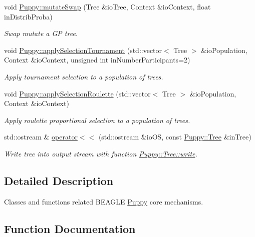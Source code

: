 \begin{DoxyCompactItemize}
void \hyperlink{group__Puppy_gab2879a2766d6a1dc22304f39d502656f}{Puppy\+::mutate\+Swap} (Tree \&io\+Tree, Context \&io\+Context, float in\+Distrib\+Proba)
\begin{DoxyCompactList}\small\item\em Swap mutate a G\+P tree. \end{DoxyCompactList}\item 
void \hyperlink{group__Puppy_gaf6abed44ba1d792876575211a238e317}{Puppy\+::apply\+Selection\+Tournament} (std\+::vector$<$ Tree $>$ \&io\+Population, Context \&io\+Context, unsigned int in\+Number\+Participants=2)
\begin{DoxyCompactList}\small\item\em Apply tournament selection to a population of trees. \end{DoxyCompactList}\item 
void \hyperlink{group__Puppy_gacdee177409bac54392b16bc8ba2f630b}{Puppy\+::apply\+Selection\+Roulette} (std\+::vector$<$ Tree $>$ \&io\+Population, Context \&io\+Context)
\begin{DoxyCompactList}\small\item\em Apply roulette proportional selection to a population of trees. \end{DoxyCompactList}\item 
std\+::ostream \& \hyperlink{group__Puppy_ga055f36ab366f6ac84c28e0f7f19103e2}{operator$<$$<$} (std\+::ostream \&io\+O\+S, const \hyperlink{classPuppy_1_1Tree}{Puppy\+::\+Tree} \&in\+Tree)
\begin{DoxyCompactList}\small\item\em Write tree into output stream with function \hyperlink{classPuppy_1_1Tree_ae7cf5b8e64273dc265a2e751f4a06ffb}{Puppy\+::\+Tree\+::write}. \end{DoxyCompactList}\end{DoxyCompactItemize}


\subsection{Detailed Description}
Classes and functions related B\+E\+A\+G\+L\+E \hyperlink{namespacePuppy}{Puppy} core mechanisms. 



\subsection{Function Documentation}
\hypertarget{group__Puppy_ga3ae29733ace7314f669f288e6f2d4a8d}{}
